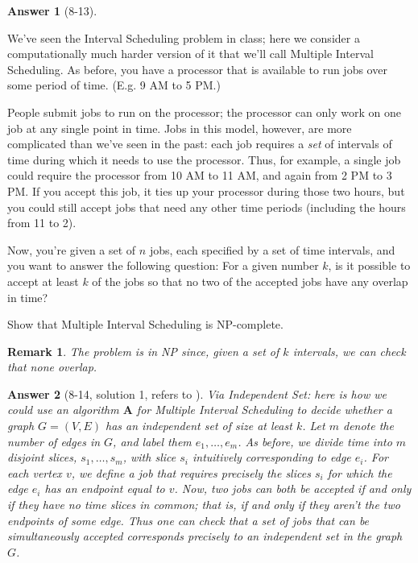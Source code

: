 \documentclass[11pt]{article}
\theoremstyle{numberplain}
\theoremstyle{nonumberplain}
\newtheorem{rem}{Remark}
\newtheorem{ans}{Answer}
\newcommand{\0}{{\mathbf{0}}}
\begin{document}
\begin{ans}[8-13]
\end{ans}
\begin{ques}[8-14]
We've seen the
Interval Scheduling problem in class;
here we consider a computationally much harder version of it that we'll call
{\sc Multiple Interval Scheduling}.
As before, you have a processor that is available to
run jobs over some period of time.
(E.g. 9 AM to 5 PM.)

People submit jobs to run on the processor;
the processor can only work on one job at any single point in time.
Jobs in this model, however, are more complicated than we've seen in the past:
each job requires a {\em set} of intervals of time
during which it needs to use the processor.
Thus, for example, a single job could require
the processor from 10 AM to 11 AM, and again from 2 PM to 3 PM.
If you accept this job, it ties up your processor during
those two hours, but you could still accept jobs that
need any other time periods (including the hours from 11 to 2).

Now, you're given a set of $n$ jobs, each specified by
a set of time intervals, and you want to
answer the following question:
For a given number $k$, is it possible to accept
at least $k$ of the jobs so that no two of the accepted
jobs have any overlap in time?

Show that {\sc Multiple Interval Scheduling}
is NP-complete.
\end{ques}
\begin{rem} The problem is in NP since, given a set of $k$ intervals,
we can check that none overlap.

\end{rem}
\begin{ans}[8-14, solution 1, refers to \cite{solcornell}]
\vskip 0.1in
Via
{\sc Independent Set}: here is how we could use
an algorithm $\mathbf{A}$ for {\sc Multiple Interval Scheduling}
to decide whether a graph $G = (V,E)$ has an 
independent set of size at least $k$.
Let $m$ denote the number of edges in $G$, and
label them $e_1, \ldots, e_m$.
As before, we divide time into $m$ disjoint {\em slices},
$s_1, \ldots, s_m$, with slice $s_i$ intuitively 
corresponding to edge $e_i$.
For each vertex $v$, we define a job that requires precisely
the slices $s_i$ for which the edge $e_i$ has an endpoint equal to $v$.
Now, two jobs can both be accepted if and only if they
have no time slices in common; that is, if and only if they
aren't the two endpoints of some edge.
Thus one can check that a set of jobs that can be
simultaneously accepted corresponds precisely to 
an independent set in the graph $G$.
\end{ans}
\end{document}
